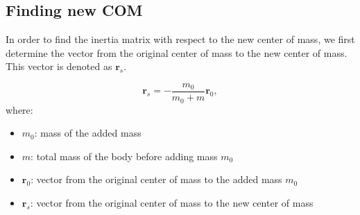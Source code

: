 \subsection{Finding new COM}

In order to find the inertia matrix with respect to the new center of mass, we first determine the vector from the original center of mass to the new center of mass. This vector is denoted as $\mathbf{r}_s$.

\begin{equation}
    \mathbf{r}_s = -\frac{m_0}{m_0 + m} \mathbf{r}_0,
\end{equation}
where: 
\begin{itemize}
    \item $m_0$: mass of the added mass
    \item $m$: total mass of the body before adding mass $m_0$
    \item $\mathbf{r}_0$: vector from the original center of mass to the added mass $m_0$
    \item $\mathbf{r}_s$: vector from the original center of mass to the new center of mass
\end{itemize}

